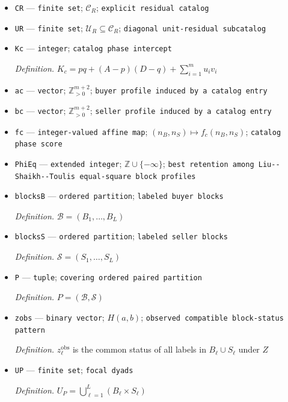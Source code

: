 \documentclass{article}
\begin{document}
\begin{itemize}
  \item \texttt{CR} --- \texttt{finite set}; \(\mathcal C_R\); \texttt{explicit residual catalog}
  \item \texttt{UR} --- \texttt{finite set}; \(\mathcal U_R\subseteq\mathcal C_R\); \texttt{diagonal unit-\allowbreak{}residual subcatalog}
  \item \texttt{Kc} --- \texttt{integer}; \texttt{catalog phase intercept}
  \par\smallskip\noindent\emph{Definition.} \(K_c=pq+(A-p)(D-q)+\sum_{i=1}^{m}u_iv_i\)
  \item \texttt{ac} --- \texttt{vector}; \(\mathbb Z_{>0}^{m+2}\); \texttt{buyer profile induced by a catalog entry}
  \item \texttt{bc} --- \texttt{vector}; \(\mathbb Z_{>0}^{m+2}\); \texttt{seller profile induced by a catalog entry}
  \item \texttt{fc} --- \texttt{integer-\allowbreak{}valued affine map}; \((n_B,n_S)\mapsto f_c(n_B,n_S)\); \texttt{catalog phase score}
  \item \texttt{PhiEq} --- \texttt{extended integer}; \(\mathbb Z\cup\{-\infty\}\); \texttt{best retention among Liu-\allowbreak{}-\allowbreak{}Shaikh-\allowbreak{}-\allowbreak{}Toulis equal-\allowbreak{}square block profiles}
  \item \texttt{blocksB} --- \texttt{ordered partition}; \texttt{labeled buyer blocks}
  \par\smallskip\noindent\emph{Definition.} \(\mathscr B=(B_1,\ldots,B_L)\)
  \item \texttt{blocksS} --- \texttt{ordered partition}; \texttt{labeled seller blocks}
  \par\smallskip\noindent\emph{Definition.} \(\mathscr S=(S_1,\ldots,S_L)\)
  \item \texttt{P} --- \texttt{tuple}; \texttt{covering ordered paired partition}
  \par\smallskip\noindent\emph{Definition.} \(P=(\mathscr B,\mathscr S)\)
  \item \texttt{zobs} --- \texttt{binary vector}; \(H(a,b)\); \texttt{observed compatible block-\allowbreak{}status pattern}
  \par\smallskip\noindent\emph{Definition.} \(z^{\mathrm{obs}}_\ell\) is the common status of all labels in \(B_\ell\cup S_\ell\) under \(Z\)
  \item \texttt{UP} --- \texttt{finite set}; \texttt{focal dyads}
  \par\smallskip\noindent\emph{Definition.} \(U_P=\bigcup_{\ell=1}^{L}(B_\ell\times S_\ell)\)

\end{itemize}
\end{document}
